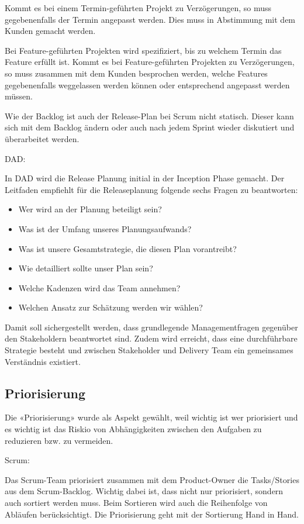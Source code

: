 Kommt es bei einem Termin-geführten Projekt zu Verzögerungen, so muss gegebenenfalls der Termin angepasst werden. Dies muss in Abstimmung mit dem Kunden gemacht werden.

Bei Feature-geführten Projekten wird spezifiziert, bis zu welchem Termin das Feature erfüllt ist. Kommt es bei Feature-geführten Projekten zu Verzögerungen, so muss zusammen mit dem Kunden besprochen werden, welche Features gegebenenfalls weggelassen werden können oder entsprechend angepasst werden müssen.\smallskip

Wie der Backlog ist auch der Release-Plan bei Scrum nicht statisch. Dieser kann sich mit dem Backlog ändern oder auch nach jedem Sprint wieder diskutiert und überarbeitet werden.
\bigskip 

{\Large DAD:} \cite{planningReleaseDad} \medskip

In DAD wird die Release Planung initial in der Inception Phase gemacht. Der Leitfaden empfiehlt für die Releaseplanung folgende sechs Fragen zu beantworten:
\begin{itemize}
	\item Wer wird an der Planung beteiligt sein?
	\item Was ist der Umfang unseres Planungsaufwands?
	\item Was ist unsere Gesamtstrategie, die diesen Plan vorantreibt?
    \item Wie detailliert sollte unser Plan sein?
    \item Welche Kadenzen wird das Team annehmen?
    \item Welchen Ansatz zur Schätzung werden wir wählen?
\end{itemize}
Damit soll sichergestellt werden, dass grundlegende Managementfragen gegenüber den Stakeholdern beantwortet sind. Zudem wird erreicht, dass eine durchführbare Strategie besteht und zwischen Stakeholder und Delivery Team ein gemeinsames Verständnis existiert.


\subsection{Priorisierung}

Die «Priorisierung» wurde als Aspekt gewählt, weil wichtig ist wer priorisiert und es wichtig ist das Riskio von Abhängigkeiten zwischen den Aufgaben zu reduzieren bzw. zu vermeiden.

{\Large Scrum:} \cite{planningPrioScrum} \medskip

Das Scrum-Team priorisiert zusammen mit dem Product-Owner die Tasks/Stories aus dem Scrum-Backlog. Wichtig dabei ist, dass nicht nur priorisiert, sondern auch sortiert werden muss. Beim Sortieren wird auch die Reihenfolge von Abläufen berücksichtigt. Die Priorisierung geht mit der Sortierung Hand in Hand. \smallskip

